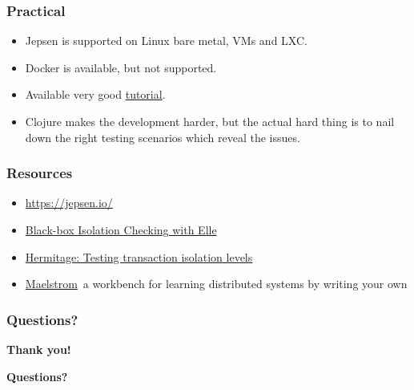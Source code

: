 \documentclass[10pt,utf8]{beamer}
\begin{document}
\begin{frame}
    \frametitle{Practical}
    \begin{itemize}
      \item Jepsen is supported on Linux bare metal, VMs and LXC.
      \item Docker is available, but not supported.
      \item Available very good \color{blue}\href{https://github.com/jepsen-io/jepsen/blob/main/doc/tutorial/index.md}{tutorial}\color{black}.
      \item Clojure makes the development harder, but the actual hard thing is to nail down the right testing scenarios which reveal the issues.
    \end{itemize}
\end{frame}

\begin{frame}
    \frametitle{Resources}
    \begin{itemize}
        \color{blue}
        \item \href{https://jepsen.io/}{https://jepsen.io/}
        \item \href{https://www.youtube.com/watch?v=OPJ_IcdSqig}{Black-box Isolation Checking with Elle}
        \item \href{https://github.com/ept/hermitage/}{Hermitage: Testing transaction isolation levels}
        \item \href{https://github.com/jepsen-io/maelstrom}{Maelstrom}\color{black}~a workbench for learning distributed systems by writing your own
    \end{itemize}
\end{frame}

\begin{frame}
    \frametitle{Questions?}
    \centering
     \textbf{\Huge{Thank you!}}
    
    \vspace{1.5cm}
    
    \textbf{\Huge{Questions?}}
    
    \vspace{1cm}
\end{frame}


\end{document}
